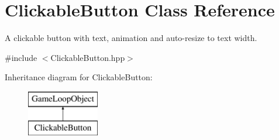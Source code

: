 \hypertarget{class_clickable_button}{}\section{Clickable\+Button Class Reference}
\label{class_clickable_button}


A clickable button with text, animation and auto-\/resize to text width.  




{\ttfamily \#include $<$Clickable\+Button.\+hpp$>$}

Inheritance diagram for Clickable\+Button\+:\begin{figure}[H]
\begin{center}
\leavevmode
\includegraphics[height=2.000000cm]{class_clickable_button}
\end{center}
\end{figure}
